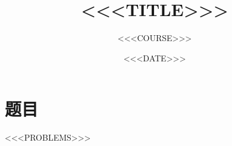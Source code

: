 \documentclass[11pt]{ctexart}
\title{<<<TITLE>>>}
\author{<<<COURSE>>>}
\date{<<<DATE>>>}
\begin{document}
\maketitle

\section*{题目}
<<<PROBLEMS>>>
\end{document}
